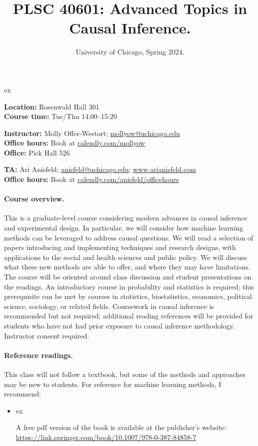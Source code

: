 \documentclass[letterpaper, 12pt, parskip=full,DIV=10]{scrartcl}
\title{PLSC 40601: Advanced Topics in Causal Inference.}
\subtitle{University of Chicago, Spring 2024.}
\date{}
\author{}
\begin{document}
\maketitle

 ex

\textbf{Location:} Rosenwald Hall 301\\
\textbf{Course time:} Tue/Thu 14.00--15:20


\textbf{Instructor:} Molly Offer-Westort; \href{mailto:mollyow@uchicago.edu}{mollyow@uchicago.edu}\\
\textbf{Office hours:} Book at \href{https://calendly.com/mollyow}{calendly.com/mollyow}\\
\textbf{Office:} Pick Hall 526 

\textbf{TA:} Ari Anisfeld; \href{mailto:anisfeld@uchicago.edu}{anisfeld@uchicago.edu}; \href{http://www.arianisfeld.com/}{www.arianisfeld.com}\\
\textbf{Office hours:} Book at \href{https://calendly.com/anisfeld/officehours}{calendly.com/anisfeld/officehours}


\paragraph{Course overview.} This is a graduate-level course considering modern advances in causal inference and experimental design. In particular, we will consider how machine learning methods can be leveraged to address causal questions. We will read a selection of papers introducing and implementing techniques and research designs, with applications to the social and health sciences and public policy. We will discuss what these new methods are able to offer, and where they may have limitations. The course will be oriented around class discussion and student presentations on the readings. An introductory course in probability and statistics is required; this prerequisite can be met by courses in statistics, biostatistics, economics, political science, sociology, or related fields. Coursework in causal inference is recommended but not required; additional reading references will be provided for students who have not had prior exposure to causal inference methodology. Instructor consent required.


\paragraph{Reference readings.}
This class will not follow a textbook, but some of the methods and approaches may be new to students. For reference for machine learning methods, I recommend:
\begin{itemize}
\item {}  ex

A free pdf version of the book is available at the publisher's website: \url{https://link.springer.com/book/10.1007/978-0-387-84858-7}
\end{itemize}
\end{document}

